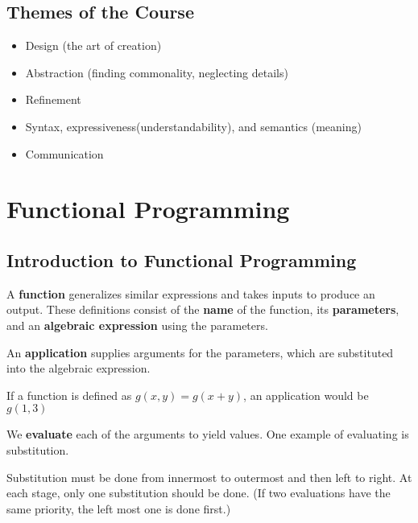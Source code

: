 \documentclass[english, 12pt]{article}
\begin{document}
\subsection{Themes of the Course}
\begin{itemize}
\item Design (the art of creation)
\item Abstraction (finding commonality, neglecting details)
\item Refinement 
\item Syntax, expressiveness(understandability), and semantics (meaning)
\item Communication
\end{itemize}
\section{Functional Programming}
\subsection{Introduction to Functional Programming}

\begin{defn}[function]
A \textbf{function} generalizes similar expressions and takes inputs to produce an output. These definitions consist of the \textbf{name} of the function, its \textbf{parameters}, and an \textbf{algebraic expression} using the parameters.
\end{defn}

\begin{defn}[application]\label{def:app}
An {\bf application} supplies arguments for the parameters, which are substituted into the algebraic expression.
\end{defn}
\begin{exmp}
If a function is defined as $g(x,y)=g(x+y)$, an application would be $g(1,3)$
\end{exmp}

\begin{exmp}
We \textbf{evaluate} each of the arguments to yield values. One example of evaluating is substitution. 
\end{exmp}

\begin{defn}[substitution]
Substitution must be done from innermost to outermost and then left to right. At each stage, only one substitution should be done. (If two evaluations have the same priority, the left most one is done first.)
\end{defn}
\end{document}
